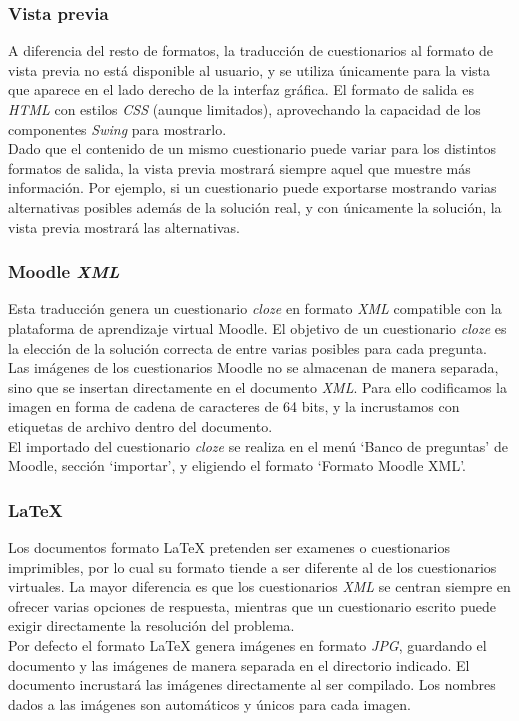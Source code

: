 
\subsubsection{Vista previa}
A diferencia del resto de formatos, la traducción de cuestionarios al formato de vista previa no está disponible al usuario, y se utiliza únicamente para la vista que aparece en el lado derecho de la interfaz gráfica.
El formato de salida es \emph{HTML} con estilos \emph{CSS} (aunque limitados), aprovechando la capacidad de los componentes \emph{Swing} para mostrarlo.
\\
Dado que el contenido de un mismo cuestionario puede variar para los distintos formatos de salida, la vista previa mostrará siempre aquel que muestre más información.
Por ejemplo, si un cuestionario puede exportarse mostrando varias alternativas posibles además de la solución real, y con únicamente la solución, la vista previa mostrará las alternativas.

\subsubsection{Moodle \emph{XML}}
Esta traducción genera un cuestionario \emph{cloze} en formato \emph{XML} compatible con la plataforma de aprendizaje virtual Moodle.
El objetivo de un cuestionario \emph{cloze} es la elección de la solución correcta de entre varias posibles para cada pregunta.
\\
Las imágenes de los cuestionarios Moodle no se almacenan de manera separada, sino que se insertan directamente en el documento \emph{XML}.
Para ello codificamos la imagen en forma de cadena de caracteres de 64 bits, y la incrustamos con etiquetas de archivo dentro del documento.
\\
El importado del cuestionario \emph{cloze} se realiza en el menú `Banco de preguntas' de Moodle, sección `importar', y eligiendo el formato `Formato Moodle XML'.


\subsubsection{\LaTeX{}}
Los documentos formato \LaTeX{} pretenden ser examenes o cuestionarios imprimibles, por lo cual su formato tiende a ser diferente al de los cuestionarios virtuales.
La mayor diferencia es que los cuestionarios \emph{XML} se centran siempre en ofrecer varias opciones de respuesta, mientras que un cuestionario escrito puede exigir directamente la resolución del problema.
\\
Por defecto el formato \LaTeX{} genera imágenes en formato \emph{JPG}, guardando el documento y las imágenes de manera separada en el directorio indicado.
El documento incrustará las imágenes directamente al ser compilado.
Los nombres dados a las imágenes son automáticos y únicos para cada imagen.

